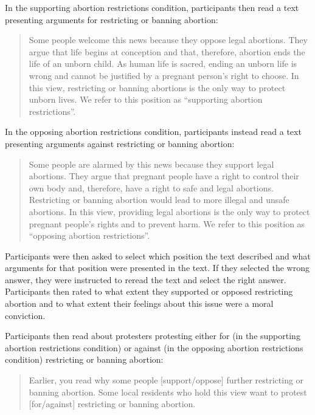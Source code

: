 \documentclass[12pt, letterpaper]{article}
\begin{document}
\noindent In the supporting abortion restrictions condition,
participants then read a text presenting arguments for restricting or
banning abortion:

\begin{quote}
Some people welcome this news because they oppose legal abortions. They
argue that life begins at conception and that, therefore, abortion ends
the life of an unborn child. As human life is sacred, ending an unborn
life is wrong and cannot be justified by a pregnant person's right to
choose. In this view, restricting or banning abortions is the only way
to protect unborn lives. We refer to this position as ``supporting
abortion restrictions''.
\end{quote}

\noindent In the opposing abortion restrictions condition, participants
instead read a text presenting arguments against restricting or banning
abortion:

\begin{quote}
Some people are alarmed by this news because they support legal
abortions. They argue that pregnant people have a right to control their
own body and, therefore, have a right to safe and legal abortions.
Restricting or banning abortion would lead to more illegal and unsafe
abortions. In this view, providing legal abortions is the only way to
protect pregnant people's rights and to prevent harm. We refer to this
position as ``opposing abortion restrictions''.
\end{quote}

\noindent Participants were then asked to select which position the text
described and what arguments for that position were presented in the
text. If they selected the wrong answer, they were instructed to reread
the text and select the right answer. Participants then rated to what
extent they supported or opposed restricting abortion and to what extent
their feelings about this issue were a moral conviction.

Participants then read about protesters protesting either for (in the
supporting abortion restrictions condition) or against (in the opposing
abortion restrictions condition) restricting or banning abortion:

\begin{quote}
Earlier, you read why some people {[}support/oppose{]} further
restricting or banning abortion. Some local residents who hold this view
want to protest {[}for/against{]} restricting or banning abortion.
\end{quote}
\end{document}
